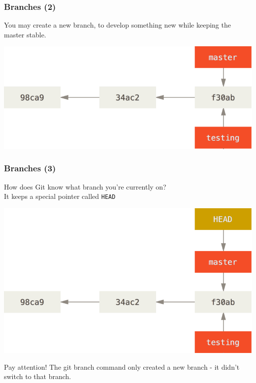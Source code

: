 \begin{frame}
  \frametitle{Branches (2)}

  You may create a new branch, to develop something new while keeping the
  master stable.

  \vspace{1em}

  \giteight

  \begin{center}
    \includegraphics[width=0.9\linewidth]{figures/git-two-branches}
  \end{center}

\end{frame}

\begin{frame}
  \frametitle{Branches (3)}

  How does Git know what branch you’re currently on?\\
  It keeps a special pointer called \texttt{HEAD}

  \begin{center}
    \includegraphics[width=0.7\linewidth]{figures/head-to-master}
  \end{center}
  
  \begin{alertblock}{Pay attention!}
    The git branch command only created a new branch - it didn't switch to that branch.
  \end{alertblock}
\end{frame}


